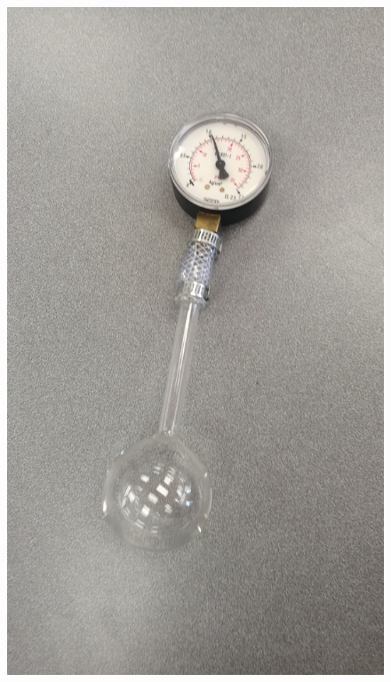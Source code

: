 \documentclass[a4paper,12pt]{article}
\begin{document}
\begin{figure}[H]
    \centering
    \begin{minipage}{.4\textwidth}
        \centering
        \includegraphics[scale=0.06]{assets/probe.jpg}
        \label{fig:probe}
    \end{minipage}%
    \begin{minipage}{.6\textwidth}
        \centering

\end{minipage}
\end{figure}
\end{document}
